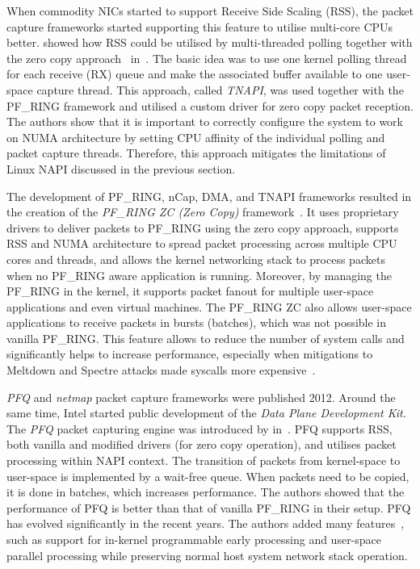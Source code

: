 When commodity NICs started to support Receive Side Scaling (RSS), the packet capture frameworks started supporting this feature to utilise multi-core CPUs better. \citeauthor{Fusco-2010-High} showed how RSS could be utilised by multi-threaded polling together with the zero copy approach~\cite{Fusco-2010-High} in~\citeyear{Fusco-2010-High}. The basic idea was to use one kernel polling thread for each receive (RX) queue and make the associated buffer available to one user-space capture thread. This approach, called \emph{TNAPI}, was used together with the PF\_RING framework and utilised a custom driver for zero copy packet reception. The authors show that it is important to correctly configure the system to work on NUMA architecture by setting CPU affinity of the individual polling and packet capture threads. Therefore, this approach mitigates the limitations of Linux NAPI discussed in the previous section. 

The development of PF\_RING, nCap, DMA, and TNAPI frameworks resulted in the creation of the \emph{PF\_RING ZC (Zero Copy)} framework~\cite{ntop--PFRING}. It uses proprietary drivers to deliver packets to PF\_RING using the zero copy approach, supports RSS and NUMA architecture to spread packet processing across multiple CPU cores and threads, and allows the kernel networking stack to process packets when no PF\_RING aware application is running. Moreover, by managing the PF\_RING in the kernel, it supports packet fanout for multiple user-space applications and even virtual machines. The PF\_RING ZC also allows user-space applications to receive packets in bursts (batches), which was not possible in vanilla PF\_RING. This feature allows to reduce the number of system calls and significantly helps to increase performance, especially when mitigations to Meltdown and Spectre attacks made syscalls more expensive~\cite{Gregg-2018-KPTIKAISER}.

\emph{PFQ} and \emph{netmap} packet capture frameworks were published 2012. Around the same time, Intel started public development of the \emph{Data Plane Development Kit}. The \emph{PFQ} packet capturing engine was introduced by \citeauthor{Bonelli-2012-Multi} in~\cite{Bonelli-2012-Multi}. PFQ supports RSS, both vanilla and modified drivers (for zero copy operation), and utilises packet processing within NAPI context. The transition of packets from kernel-space to user-space is implemented by a wait-free queue. When packets need to be copied, it is done in batches, which increases performance. The authors showed that the performance of PFQ is better than that of vanilla PF\_RING in their setup. PFQ has evolved significantly in the recent years. The authors added many features~\cite{Bonelli-2014-Purely, Bonelli-2016-Network, Bonelli-2017-Enabling}, such as support for in-kernel programmable early processing and user-space parallel processing while preserving normal host system network stack operation.

